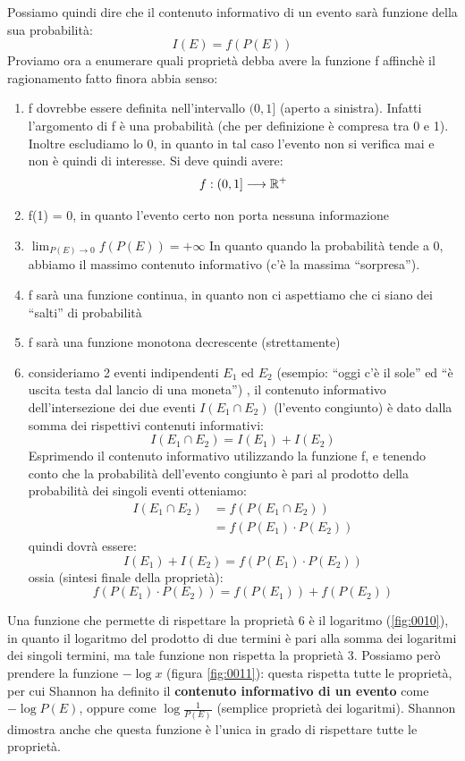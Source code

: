 Possiamo quindi dire che il contenuto informativo di un evento sarà funzione della sua probabilità:
\[I(E) = f(P(E))\]
Proviamo ora a enumerare quali proprietà debba avere la funzione f affinchè il ragionamento fatto finora abbia senso:
\begin{enumerate}
\item f dovrebbe essere definita nell'intervallo \((0,1]\) (aperto a sinistra). Infatti l'argomento di f è una probabilità (che per 
definizione è compresa tra 0 e 1). Inoltre escludiamo lo 0, in quanto in tal caso l'evento non si verifica mai e non è quindi di interesse. Si deve quindi avere:
\[f: (0,1] \longrightarrow \mathbb{R}^+\]
\item f(1) = 0, in quanto l'evento certo non porta nessuna informazione
\item $\lim_{P(E) \rightarrow 0} f(P(E)) = + \infty$
      In quanto quando la probabilità tende a 0, abbiamo il massimo contenuto informativo (c'è la massima ``sorpresa'').
\item f sarà una funzione continua, in quanto non ci aspettiamo che ci siano dei ``salti'' di probabilità
\item f sarà una funzione monotona decrescente (strettamente)
\item consideriamo 2 eventi indipendenti \(E_1\) ed \(E_2\) (esempio: ``oggi c'è il sole'' ed ``è uscita testa dal lancio di una moneta'') , il contenuto informativo dell'intersezione dei due eventi \(I(E_1 \cap E_2)\) (l'evento congiunto) è dato dalla somma dei rispettivi contenuti informativi:
\[I(E_1 \cap E_2) = I(E_1) + I(E_2)\]
Esprimendo il contenuto informativo utilizzando la funzione f, e tenendo conto che la probabilità dell'evento congiunto è pari al prodotto della probabilità dei singoli eventi otteniamo:
\[
\begin{split}
I(E_1 \cap E_2) &= f(P(E_1 \cap E_2)) \\
&= f(P(E_1) \cdot P(E_2)) 
\end{split}
\]
quindi dovrà essere:
\[I(E_1) + I(E_2) = f(P(E_1) \cdot P(E_2))  \]
ossia (sintesi finale della proprietà):
\[ f(P(E_1) \cdot P(E_2)) = f(P(E_1)) + f(P(E_2)) \]
\end{enumerate}

Una funzione che permette di rispettare la proprietà 6 è il logaritmo (\ref{fig:0010}), in quanto il logaritmo del prodotto di due termini è pari alla somma dei logaritmi dei singoli termini, ma tale funzione non rispetta la proprietà 3. Possiamo però prendere la funzione \(- \log x\) (figura \ref{fig:0011}): questa rispetta tutte le proprietà, per cui Shannon ha definito il \textbf{contenuto informativo di un evento} come \(- \log P(E)\), oppure come \(\log \frac{1}{P(E)}\) (semplice proprietà dei logaritmi).
Shannon dimostra anche che questa funzione è l'unica in grado di rispettare tutte le proprietà.

